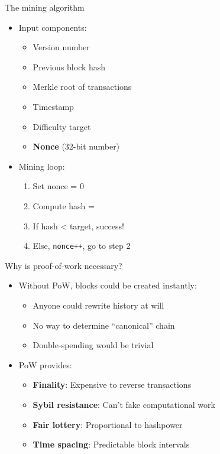 \documentclass[aspectratio=169, lualatex, handout]{beamer}
\begin{document}
\begin{frame}{The mining algorithm}
	\begin{itemize}
		\item Input components:
		      \begin{itemize}
			      \item Version number
			      \item Previous block hash
			      \item Merkle root of transactions
			      \item Timestamp
			      \item Difficulty target
			      \item \textbf{Nonce} (32-bit number)
		      \end{itemize}
		\item Mining loop:
		      \begin{enumerate}
			      \item Set nonce = 0
			      \item Compute hash = 
			      \item If hash < target, success!
			      \item Else, \texttt{nonce++}, go to step 2
		      \end{enumerate}
	\end{itemize}
\end{frame}

\begin{frame}{Why is proof-of-work necessary?}
	\begin{itemize}
		\item Without PoW, blocks could be created instantly:
		      \begin{itemize}
			      \item Anyone could rewrite history at will
			      \item No way to determine ``canonical'' chain
			      \item Double-spending would be trivial
		      \end{itemize}
		\item PoW provides:
		      \begin{itemize}
			      \item \textbf{Finality}: Expensive to reverse transactions
			      \item \textbf{Sybil resistance}: Can't fake computational work
			      \item \textbf{Fair lottery}: Proportional to hashpower
			      \item \textbf{Time spacing}: Predictable block intervals
		      \end{itemize}
	\end{itemize}
\end{frame}
\end{document}
